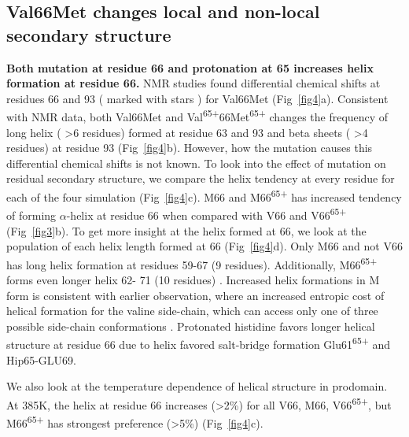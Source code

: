 \documentclass[10pt,letterpaper]{article}
\begin{document}
\subsection*{Val66Met changes local and non-local secondary structure}

\textbf{Both mutation at residue 66 and protonation at 65 increases helix formation at residue 66.} 
NMR studies found differential chemical shifts at residues 66 and 93 ( marked with stars ) for Val66Met (Fig~\ref{fig4}a). Consistent with NMR data, both Val66Met and Val\textsuperscript{65+}66Met\textsuperscript{65+} changes the frequency of long helix ( \textgreater 6 residues)  formed at residue 63 and 93 and beta sheets ( \textgreater 4 residues) at residue 93  (Fig~\ref{fig4}b). However, how the mutation causes this differential chemical shifts is not known. 
To look into the effect of mutation on residual secondary structure, we compare the helix tendency at every residue for each of the four simulation (Fig~\ref{fig4}c). M66 and M66\textsuperscript{65+} has increased tendency of forming $\alpha$-helix at residue 66 when compared with V66 and V66\textsuperscript{65+}(Fig~\ref{fig3}b). To get more insight at the helix formed at 66, we look at the population of each helix length formed at 66 (Fig~\ref{fig4}d). Only M66 and not V66 has long helix formation at residues 59-67 (9 residues). Additionally, M66\textsuperscript{65+} forms even longer helix 62- 71 (10 residues) . Increased helix formations in M form is consistent with earlier observation, where an increased entropic cost of helical formation for the valine side-chain, which can access only one of three possible side-chain conformations \cite{Creamer1992}. Protonated histidine favors longer helical structure at residue 66 due to helix favored salt-bridge formation  Glu61\textsuperscript{65+} and Hip65-GLU69. 

We also look at the temperature dependence of helical structure in prodomain. At 385K, the helix at residue 66 increases (\textgreater 2\%) for all V66, M66, V66\textsuperscript{65+}, but M66\textsuperscript{65+} has strongest preference (\textgreater 5\%) (Fig~\ref{fig4}c). 
\end{document}
